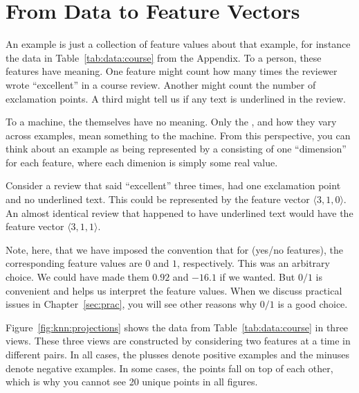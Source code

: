 \section{From Data to Feature Vectors}

An example is just a collection of feature values about that example,
for instance the data in Table~\ref{tab:data:course} from the Appendix.
To a person, these features have meaning.  One feature might count how
many times the reviewer wrote ``excellent'' in a course review.
Another might count the number of exclamation points.  A third might
tell us if any text is underlined in the review.

To a machine, the  themselves have no meaning.  Only
the , and how they vary across examples, mean
something to the machine.  From this perspective, you can think about
an example as being represented by a 
consisting of one ``dimension'' for each feature, where each dimenion
is simply some real value.

Consider a review that said ``excellent'' three times, had one
exclamation point and no underlined text.  This could be represented
by the feature vector $\langle 3, 1, 0 \rangle$.  An almost identical
review that happened to have underlined text would have the feature
vector $\langle 3,1,1\rangle$.

Note, here, that we have imposed the convention that for
 (yes/no features), the corresponding feature
values are $0$ and $1$, respectively.  This was an arbitrary choice.
We could have made them $0.92$ and $-16.1$ if we wanted.  But $0/1$ is
convenient and helps us interpret the feature values.  When we discuss
practical issues in Chapter~\ref{sec:prac}, you will see other reasons
why $0/1$ is a good choice.


Figure~\ref{fig:knn:projections} shows the data from
Table~\ref{tab:data:course} in three views.  These three views are
constructed by considering two features at a time in different pairs.
In all cases, the plusses denote positive examples and the minuses
denote negative examples.  In some cases, the points fall on top of
each other, which is why you cannot see 20 unique points in all
figures.


